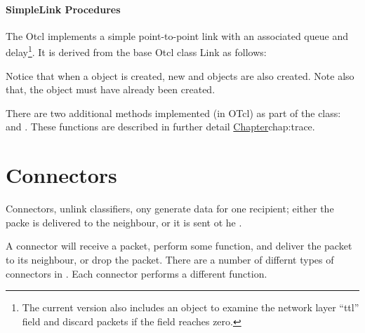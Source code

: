 \paragraph{SimpleLink Procedures}
The Otcl 
implements a simple point-to-point
link with an associated queue and delay\footnote{The current
version also includes an object to examine the
network layer ``ttl'' field and discard packets if the
field reaches zero.}.
It is derived from the base Otcl class Link as follows:
Notice that when a  object is created,
new  and  objects are
also created.
Note also that,
the  object must have already been created.

There are two additional methods implemented (in OTcl) as part
of the  class:  and .
These functions are described in further detail
\href{in the section on tracing}{Chapter}{chap:trace}. 

\section{Connectors}
\label{sec:links:connectors}

Connectors, unlink  classifiers, ony generate data for one recipient;
either the packe is delivered to the  neighbour, or it
is sent ot he .

A connector will receive a packet, perform some function,
and deliver the packet to its neighbour, or drop the packet.
There are a number of differnt types of connectors in \ns.
Each connector performs a different function.

